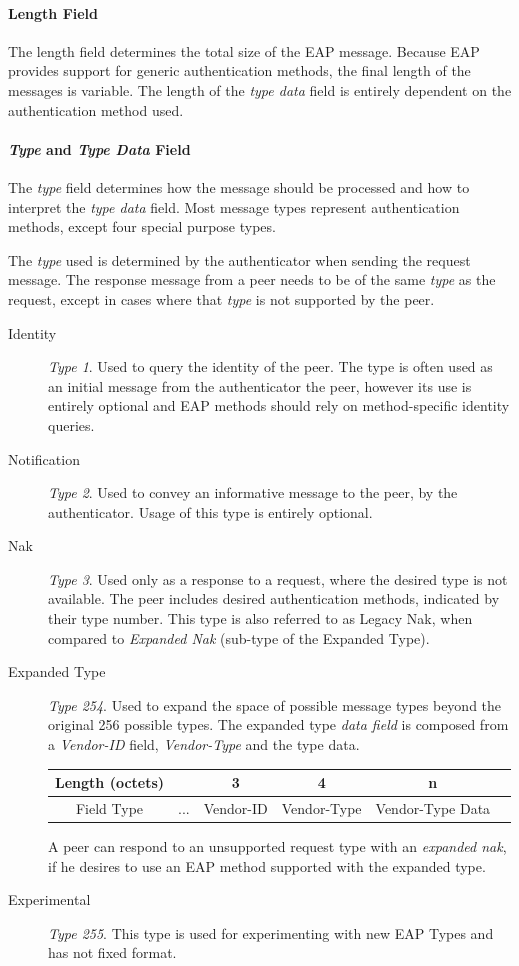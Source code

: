 \paragraph{Length Field}
The length field determines the total size of the EAP message. Because EAP provides support for generic authentication methods, the final length of the messages is variable.
The length of the \textit{type data} field is entirely dependent on the authentication method used.

\paragraph{\textit{Type} and \textit{Type Data} Field}
The \textit{type} field determines how the message should be processed and how to interpret the \textit{type data} field.
Most message types represent authentication methods, except four special purpose types.

The \textit{type} used is determined by the authenticator when sending the request message. The response message from a peer needs to be of the same \textit{type} as the request, except in cases where that \textit{type} is not supported by the peer.

\begin{description}
	\item[Identity] \textit{Type 1}. Used to query the identity of the peer. The type is often used as an initial message from the authenticator the peer, however its use is entirely optional and EAP methods should rely on method-specific identity queries.
	
	\item[Notification]\textit{Type 2}. Used to convey an informative message to the peer, by the authenticator. Usage of this type is entirely optional.
	\item[Nak]\textit{Type 3}. Used only as a response to a request, where the desired type is not available.
	The peer includes desired authentication methods, indicated by their type number.
	This type is also referred to as Legacy Nak, when compared to \textit{Expanded Nak} (sub-type of the Expanded Type).
	\item[Expanded Type] \textit{Type 254}. 
	Used to expand the space of possible message types beyond the original 256 possible types.
	The expanded type \textit{data field} is composed from a \textit{Vendor-ID} field, \textit{Vendor-Type} and the type data.
	\bigskip
	\begin{center}
		\begin{tabular}{|c|c|c|c|c|c|}
		\cline{2-5}
		\hline
		Length (octets) & & 3 & 4 & n\\
		\hline
		Field Type & ... & Vendor-ID & Vendor-Type & Vendor-Type Data\\
		\hline
		\end{tabular}
	\end{center}
	\bigskip
	A peer can respond to an unsupported request type with an \textit{expanded nak}, if he desires to use an EAP method supported with the expanded type.
	\item[Experimental] \textit{Type 255}. This type is used for experimenting with new EAP Types and has not fixed format.
\end{description}

